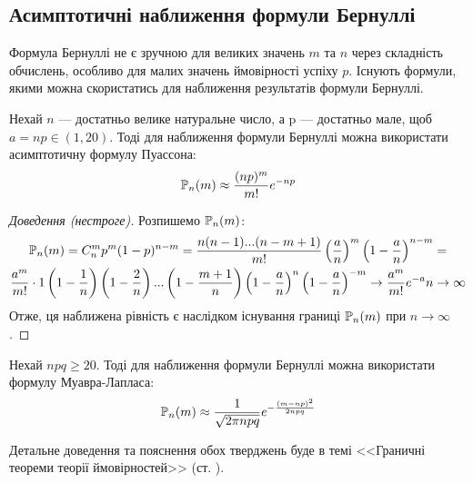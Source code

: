 \subsection{Асимптотичні наближення формули Бернуллі}
Формула Бернуллі не є зручною для великих значень $m$ та $n$ через складність обчислень, особливо для малих значень ймовірності успіху $p$. Існують формули, якими можна 
скористатись для наближення результатів формули Бернуллі.
\begin{proposition*}
    Нехай $n$ --- достатньо велике натуральне число, а p --- достатньо мале, щоб 
    $a = np \in (1, 20)$. Тоді для наближення формули Бернуллі можна використати 
    асимптотичну формулу Пуассона:
    \begin{equation}\label{eq:poiss_aprox}
        \P_n(m) \approx \frac{(np)^m}{m!}e^{-np}
    \end{equation}
\end{proposition*}
\begin{proof}[Доведення (нестроге)] Розпишемо $\P_n(m)$:
    \begin{gather*}
        \P_n(m) = C_n^m p^m (1-p)^{n-m} = \frac{n(n-1)...(n-m+1)}{m!} \left(\frac{a}{n}\right)^m 
        \left(1-\frac{a}{n}\right)^{n-m} = \\
        \frac{a^m}{m!}\cdot 1 \left(1 - \frac{1}{n}\right)\left(1 - \frac{2}{n}\right)
        ...\left(1 - \frac{m+1}{n}\right)\left(1-\frac{a}{n}\right)^n \left(1-\frac{a}{n}\right)^{-m} 
        \to \frac{a^m}{m!}e^{-a} n\to\infty
    \end{gather*}
    Отже, ця наближена рівність є наслідком існування границі $\P_n(m)$ при $n\to\infty$. 
\end{proof}
\begin{proposition*}
    Нехай $npq \geq 20$. Тоді для наближення формули Бернуллі можна використати 
    формулу Муавра-Лапласа:
    \begin{equation}\label{eq:laplace_approx}
        \P_n(m) \approx \frac{1}{\sqrt{2\pi npq}} e^{-\frac{(m-np)^2}{2npq}}
    \end{equation}
\end{proposition*}
Детальне доведення та пояснення обох тверджень буде в темі <<Граничні теореми теорії ймовірностей>> (ст. \pageref{binom_theorems}).

